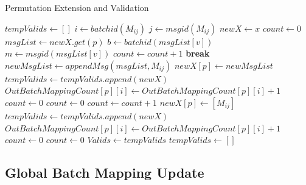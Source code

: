 \documentclass{article}
\begin{document}
\begin{algorithm}
\caption{Permutation Extension and Validation}
\label{alg:phase3}
\begin{algorithmic}[1]
    \State $tempValids \gets []$
        \State $ i \gets batchid(M_{ij}) $
        \State $ j \gets msgid(M_{ij}) $
            \State $ newX \gets x $
            \State $count \gets 0$
            \State $ msgList \gets newX.get(p) $
                \State {}
                    \State $ b \gets batchid(msgList[v]) $
                    \State $ m \gets msgid(msgList[v]) $
                        \State $count \gets count + 1$
                    \Else
                        \State \textbf{break}
                    \EndIf
                \EndFor
                    \State $ newMsgList \gets appendMsg( msgList,M_{ij})$
                    \State $newX[p] \gets newMsgList $
                    \State $tempValids \gets tempValids.append(newX)$
                    \State $ OutBatchMappingCount[p][i] \gets OutBatchMappingCount[p][i] + 1$
                    \State $count \gets 0$
                \Else
                    \State $count \gets 0$
                \EndIf
            \Else
                \State {}
                        \State $count \gets count + 1$
                    \EndIf
                \EndFor
                    \State $newX [p] \gets  [M_{ij}] $
                    \State $ tempValids \gets tempValids.append(newX) $
                    \State $ OutBatchMappingCount[p][i] \gets OutBatchMappingCount[p][i] + 1 $
                    \State $count \gets 0$
                \Else
                    \State $count \gets 0$
                \EndIf
            \EndIf
        \EndFor
    \EndFor
    \State $ Valids \gets tempValids $
    \State $ tempValids \gets [] $
\EndIf
\end{algorithmic}
\end{algorithm}

\subsection{Global Batch Mapping Update}
\end{document}
